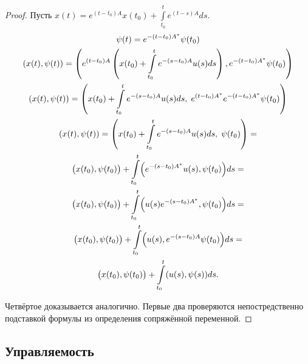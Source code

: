 \begin{proof}
    Пусть $x(t) = e^{(t - t_0)A} x(t_0) + \int\limits_{t_0}^{t} e^{(t-s)A} ds$.
    \begin{gather*}
        \psi(t) = e^{-(t - t_0)A^*} \psi(t_0) \\
        (x(t), \psi(t)) = \left( e^{(t - t_0)A} \left(x(t_0) + \int\limits_{t_0}^{t} e^{-(s-t_0)A}u(s) ds \right), e^{-(t - t_0)A^*} \psi(t_0) \right)\\
        (x(t), \psi(t)) = \left( x(t_0) + \int\limits_{t_0}^{t} e^{-(s-t_0)A} u(s) ds, \; e^{(t - t_0)A^*} e^{-(t - t_0)A^*} \psi(t_0) \right)\\
        (x(t), \psi(t)) = \left( x(t_0) + \int\limits_{t_0}^{t} e^{-(s-t_0)A} u(s) ds, \; \psi(t_0) \right) = \\
        \bigl(x(t_0), \psi(t_0)\bigr) + \int\limits_{t_0}^{t} \Bigl(e^{-(s - t_0)A^*}u(s), \psi(t_0)\Bigr) ds = \\
        \bigl(x(t_0), \psi(t_0)\bigr) + \int\limits_{t_0}^{t} \Bigl(u(s) e^{-(s - t_0)A^*}, \psi(t_0) \Bigr) ds = \\
        \bigl(x(t_0), \psi(t_0)\bigr) + \int\limits_{t_0}^{t} \Bigl(u(s), e^{-(s - t_0)A} \psi(t_0) \Bigr) ds = \\
        \bigl(x(t_0), \psi(t_0)\bigr) + \int\limits_{t_0}^{t} (u(s), \psi(s)) ds.
    \end{gather*}

    Четвёртое доказывается аналогично.
    Первые два проверяются непостредственно подставкой формулы из определения сопряжённой переменной.
\end{proof}

\subsection{Управляемость}

